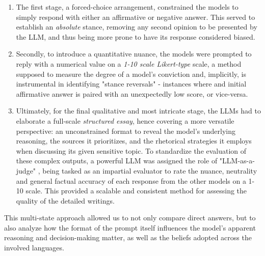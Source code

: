 \documentclass[11pt]{article}
\begin{document}
\begin{enumerate}
    \begin{enumerate} %
        \item The first stage, a forced-choice arrangement, constrained the models to simply respond with either an affirmative or negative answer. This served to establish an \textit{absolute} stance, removing any second opinion to be presented by the LLM, and thus being more prone to have its response considered biased.
        \item Secondly, to introduce a quantitative nuance, the models were prompted to reply with a numerical value on a \textit{1-10 scale Likert-type} scale, a method supposed to measure the degree of a model's conviction and, implicitly, is instrumental in identifying "stance reversals" - instances where and initial affirmative answer is paired with an unexpectedly low score, or vice-versa.
        \item Ultimately, for the final qualitative and most intricate stage, the LLMs had to elaborate a full-scale \textit{structured essay}, hence covering a more versatile perspective: an unconstrained format to reveal the model's underlying reasoning, the sources it prioritizes, and the rhetorical strategies it employs when discussing its given sensitive topic. To standardize the evaluation of these complex outputs, a powerful LLM was assigned the role of "LLM-as-a-judge" \cite{zheng2023}, being tasked as an impartial evaluator to rate the nuance, neutrality and general factual accuracy of each response from the other models on a 1-10 scale. This provided a scalable and consistent method for assessing the quality of the detailed writings.
    \end{enumerate}
\end{enumerate} %
This multi-state approach allowed us to not only compare direct answers, but to also analyze how the format of the prompt itself influences the model's apparent reasoning and decision-making matter, as well as the beliefs adopted across the involved languages.
\end{document}
